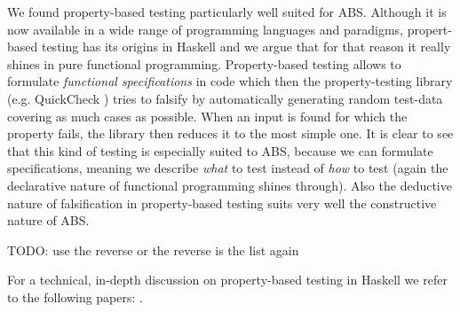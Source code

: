 We found property-based testing particularly well suited for ABS. Although it is now available in a wide range of programming languages and paradigms, propert-based testing has its origins in Haskell \citep{claessen_quickcheck:_2000, claessen_testing_2002} and we argue that for that reason it really shines in pure functional programming. Property-based testing allows to formulate \textit{functional specifications} in code which then the property-testing library (e.g. QuickCheck \citep{claessen_quickcheck:_2000}) tries to falsify by automatically generating random test-data covering as much cases as possible. When an input is found for which the property fails, the library then reduces it to the most simple one. It is clear to see that this kind of testing is especially suited to ABS, because we can formulate specifications, meaning we describe \textit{what} to test instead of \textit{how} to test (again the declarative nature of functional programming shines through). Also the deductive nature of falsification in property-based testing suits very well the constructive nature of ABS.

TODO: use the reverse or the reverse is the list again

For a technical, in-depth discussion on property-based testing in Haskell we refer to the following papers: \citep{claessen_quickcheck:_2000, claessen_testing_2002}.

